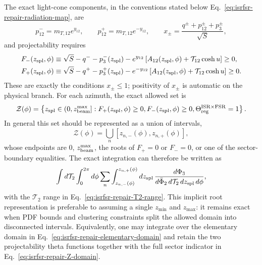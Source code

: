 \documentclass[11pt]{article}
\newcommand{\Ph}{\Phi}
\begin{document}
The exact light-cone components, in the conventions stated below
Eq.~\eqref{eq:isrfsr-repair-radiation-map}, are
\begin{equation}
p_{12}^-
=
m_{T,12}e^{y_{12}},
\qquad
p_{12}^+
=
m_{T,12}e^{-y_{12}},
\qquad
x_\pm
=
\frac{
q^\pm+p_{12}^\pm+p_3^\pm
}{\sqrt S},
\label{eq:isrfsr-repair-exact-xfractions}
\end{equation}
and projectability requires
\begin{align}
F_-(z_{\rm spl},\phi)
&\equiv
\sqrt S-q^--p_3^-(z_{\rm spl})
-e^{y_{12}}
\left[
A_{12}(z_{\rm spl},\phi)
+\mathcal T_{12}\cosh u
\right]
\ge0,
\nonumber\\
F_+(z_{\rm spl},\phi)
&\equiv
\sqrt S-q^+-p_3^+(z_{\rm spl})
-e^{-y_{12}}
\left[
A_{12}(z_{\rm spl},\phi)
+\mathcal T_{12}\cosh u
\right]
\ge0.
\label{eq:isrfsr-repair-Fpm-bounds}
\end{align}
These are exactly the conditions $x_\pm\le1$; positivity of $x_\pm$ is automatic on the physical branch.
For each azimuth, the exact allowed set is
\begin{equation}
\mathcal Z(\phi)
=
\left\{
z_{\rm spl}\in(0,z_{\rm beam}^{\max}]:
F_+(z_{\rm spl},\phi)\ge0,
F_-(z_{\rm spl},\phi)\ge0,
\Theta_{\rm reg}^{\rm ISR\times FSR}=1
\right\}.
\label{eq:isrfsr-repair-Z-domain}
\end{equation}
In general this set should be represented as a union of intervals,
\begin{equation}
\mathcal Z(\phi)
=
\bigcup_n
\left[
z_{n,-}(\phi),z_{n,+}(\phi)
\right],
\label{eq:isrfsr-repair-Z-intervals}
\end{equation}
whose endpoints are $0$, $z_{\rm beam}^{\max}$, the roots of $F_+=0$ or $F_-=0$, or one of the
sector-boundary equalities.  The exact
integration can therefore be written as
\begin{equation}
\int d\mathcal T_2
\int_0^{2\pi}d\phi
\sum_n
\int_{z_{n,-}(\phi)}^{z_{n,+}(\phi)}
dz_{\rm spl}\,
\frac{d\Ph_3}
{d\bar\Ph_2\,d\mathcal T_2\,dz_{\rm spl}\,d\phi},
\label{eq:isrfsr-repair-final-integration-domain}
\end{equation}
with the $\mathcal T_2$ range in Eq.~\eqref{eq:isrfsr-repair-T2-range}.  This implicit root representation is
preferable to assuming a single $z_{\min}$ and $z_{\max}$: it remains exact when PDF bounds and clustering
constraints split the allowed domain into disconnected intervals.  Equivalently, one may integrate over the
elementary domain in Eq.~\eqref{eq:isrfsr-repair-elementary-domain} and retain the two projectability theta
functions together with the full sector indicator in Eq.~\eqref{eq:isrfsr-repair-Z-domain}.
\end{document}
